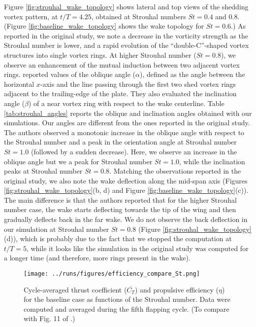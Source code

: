 Figure \ref{fig:strouhal_wake_topology} shows lateral and top views of the shedding vortex pattern, at $t/T = 4.25$, obtained at Strouhal numbers $St = 0.4$ and $0.8$.
(Figure \ref{fig:baseline_wake_topology} shows the wake topology for $St = 0.6$.)
As reported in the original study, we note a decrease in the vorticity strength as the Strouhal number is lower, and a rapid evolution of the ``double-C''-shaped vortex structures into single vortex rings.
At higher Strouhal number ($St = 0.8$), we observe an enhancement of the mutual induction between two adjacent vortex rings.
\citet{li_dong_2016} reported values of the oblique angle ($\alpha$), defined as the angle between the horizontal $x$-axis and the line passing through the first two shed vortex rings adjacent to the trailing-edge of the plate.
They also evaluated the inclination angle ($\beta$) of a near vortex ring with respect to the wake centerline.
Table \ref{tab:strouhal_angles} reports the oblique and inclination angles obtained with our simulations.
Our angles are different from the ones reported in the original study.
The authors observed a monotonic increase in the oblique angle with respect to the Strouhal number and a peak in the orientation angle at Strouhal number $St = 1.0$ (followed by a sudden decrease).
Here, we observe an increase in the oblique angle but we a peak for Strouhal number $St = 1.0$, while the inclination peaks at Strouhal number $St = 0.8$.
Matching the observations reported in the original study, we also note the wake deflection along the mid-span axis (Figures \ref{fig:strouhal_wake_topology}(b, d) and Figure \ref{fig:baseline_wake_topology}(c)).
The main difference is that the authors reported that for the higher Strouhal number case, the wake starts deflecting towards the tip of the wing and then gradually deflects back in the far wake.
We do not observe the back deflection in our simulation at Strouhal number $St = 0.8$ (Figure \ref{fig:strouhal_wake_topology}(d)), which is probably due to the fact that we stopped the computation at $t/T = 5$, while it looks like the simulation in the original study was computed for a longer time (and therefore, more rings present in the wake).

\begin{figure}
  \centering
  \texttt{[image: ../runs/figures/efficiency\_compare\_St.png]}
  \caption{Cycle-averaged thrust coefficient ($\overline{C_T}$) and propulsive efficiency ($\eta$) for the baseline case as functions of the Strouhal number. Data were computed and averaged during the fifth flapping cycle. (To compare with Fig. 11 of \citet{li_dong_2016}.)}
  \label{fig:strouhal_propulsive_efficiency}
\end{figure}

